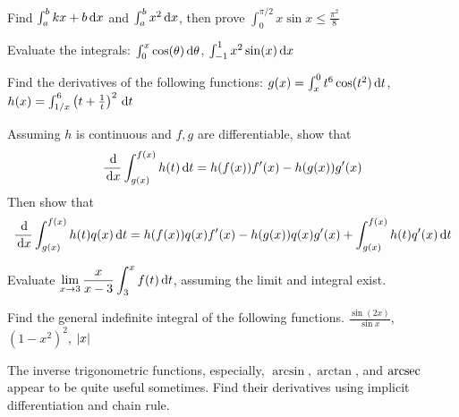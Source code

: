 \documentclass[Calculus 1 Recitation.tex]{subfiles}
\begin{document}
\begin{myleftlinebox}
	Find $\int_a^b kx+b\,\mathrm{d} x$ and $\int_a^b x^2\,\mathrm{d} x$, then prove $\int_0^{\pi/2} x\sin x\leq \frac{\pi^2}{8}$
	\tcblower
	\vspace{2em}
\end{myleftlinebox}

\begin{myleftlinebox}
	Evaluate the integrals: $\int_{0}^{x}\cos(\theta)\,\mathrm{d} \theta$, $\int_{-1}^1 x^2\sin(x) \,\mathrm{d} x$
	\tcblower
	\vspace{2em}
\end{myleftlinebox}

\begin{myleftlinebox}
	Find the derivatives of the following functions: $g(x)=\int_x^0 t^6\cos(t^2)\,\mathrm{d} t$, $h(x)=\int_{1/x}^6 \left( t+\frac{1}{t} \right)^2\,\mathrm{d} t$
	\tcblower
	\vspace{2em}
\end{myleftlinebox}

\begin{myleftlinebox}
	Assuming $h$ is continuous and $f,g$ are differentiable, show that
	\[\frac{\,\mathrm{d}}{\,\mathrm{d} x} \int_{g(x)}^{f(x)} h(t)\,\mathrm{d} t = h(f(x))f'(x)-h(g(x))g'(x)\]
	Then show that
	\[\frac{\,\mathrm{d}}{\,\mathrm{d} x} \int_{g(x)}^{f(x)} h(t)q(x)\,\mathrm{d} t = h(f(x))q(x)f'(x)-h(g(x))q(x)g'(x)+\int_{g(x)}^{f(x)} h(t)q'(x)\,\mathrm{d} t\]
	\tcblower
	\vspace{2em}
\end{myleftlinebox}

\begin{myleftlinebox}
	Evaluate $\displaystyle \lim_{x\to 3}\frac{x}{x-3}\int_3^x f(t)\,\mathrm{d} t$, assuming the limit and integral exist.
	\tcblower
	\vspace{2em}
\end{myleftlinebox}

\begin{myleftlinebox}
	Find the general indefinite integral of the following functions. $\frac{\sin(2x)}{\sin x}$, $(1-x^2)^2$, $\left\vert x\right\vert$
	\tcblower
	\vspace{2em}
\end{myleftlinebox}

\begin{myleftlinebox}
	The inverse trigonometric functions, especially, $\arcsin, \arctan$, and $\operatorname{arcsec}$ appear to be quite useful sometimes. Find their derivatives using implicit differentiation and chain rule.
	\tcblower
	\vspace{2em}
\end{myleftlinebox}
\end{document}
